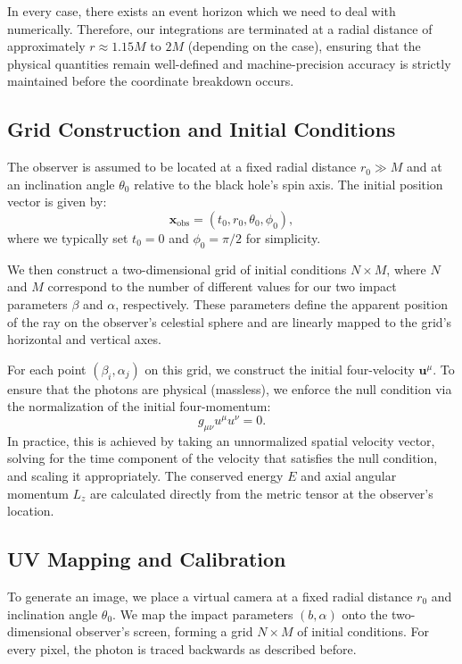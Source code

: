\documentclass[11pt]{book}
\begin{document}
In every case, there exists an event horizon which we need to deal with numerically. Therefore, our integrations are terminated at a radial distance of approximately \(r \approx 1.15 M\) to \(2 M\) (depending on the case), ensuring that the physical quantities remain well-defined and machine-precision accuracy is strictly maintained before the coordinate breakdown occurs.

\subsection{Grid Construction and Initial Conditions}
The observer is assumed to be located at a fixed radial distance \(r_0 \gg M\) and at an inclination angle \(\theta_0\) relative to the black hole's spin axis. The initial position vector is given by:
\begin{equation}
    \bm{x}_{\text{obs}} = (t_0, r_0, \theta_0, \phi_0),
\end{equation}
where we typically set \(t_0 = 0\) and \(\phi_0 = \pi/2\) for simplicity. 

We then construct a two-dimensional grid of initial conditions \(N \times M\), where \(N\) and \(M\) correspond to the number of different values for our two impact parameters \(\beta\) and \(\alpha\), respectively. These parameters define the apparent position of the ray on the observer's celestial sphere and are linearly mapped to the grid's horizontal and vertical axes.

For each point \((\beta_i, \alpha_j)\) on this grid, we construct the initial four-velocity \(\bm{u}^\mu\). To ensure that the photons are physical (massless), we enforce the null condition via the normalization of the initial four-momentum:
\begin{equation}
    g_{\mu\nu} u^\mu u^\nu = 0.
\end{equation}
In practice, this is achieved by taking an unnormalized spatial velocity vector, solving for the time component of the velocity that satisfies the null condition, and scaling it appropriately. The conserved energy \(E\) and axial angular momentum \(L_z\) are calculated directly from the metric tensor at the observer's location.

\subsection{UV Mapping and Calibration}

To generate an image, we place a virtual camera at a fixed radial distance \(r_0\) and inclination angle \(\theta_0\). We map the impact parameters \((b, \alpha)\) onto the two-dimensional observer's screen, forming a grid \(N \times M\) of initial conditions. For every pixel, the photon is traced backwards as described before.
\end{document}
